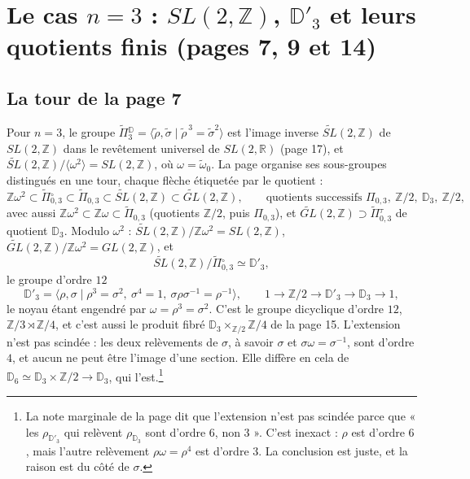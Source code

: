 \documentclass[11pt,a4paper]{article}
\begin{document}
\section*{Le cas $n = 3$ : $SL(2, \mathbb{Z})$, $\mathbb{D}'_3$ et leurs quotients finis (pages 7, 9 et 14)}

\subsection*{La tour de la page 7}

Pour $n = 3$, le groupe $\widetilde{\Pi}{}^{\mathbb{D}}_3 = \langle \tilde\rho,
\tilde\sigma \mid \tilde\rho^{\,3} = \tilde\sigma^2 \rangle$ est l'image inverse
$\widetilde{SL}(2, \mathbb{Z})$ de $SL(2, \mathbb{Z})$ dans le revêtement universel
de $SL(2, \mathbb{R})$ (page 17), et $\widetilde{SL}(2, \mathbb{Z}) /
\langle \omega^2 \rangle = SL(2, \mathbb{Z})$, où $\omega = \tilde\omega_0$. La page
organise ses sous-groupes distingués en une tour, chaque flèche étiquetée par le
quotient :
\[
\mathbb{Z}\omega^2 \subset \widetilde{\Pi}{}^{\circ}_{0,3} \subset
\widetilde{\Pi}_{0,3} \subset \widetilde{SL}(2, \mathbb{Z}) \subset
\widetilde{GL}(2, \mathbb{Z}),
\qquad
\text{quotients successifs } \Pi_{0,3},\ \mathbb{Z}/2,\ \mathbb{D}_3,\ \mathbb{Z}/2 ,
\]
avec aussi $\mathbb{Z}\omega^2 \subset \mathbb{Z}\omega \subset
\widetilde{\Pi}_{0,3}$ (quotients $\mathbb{Z}/2$, puis $\Pi_{0,3}$), et
$\widetilde{GL}(2, \mathbb{Z}) \supset \widetilde{\Pi}{}^{\tau}_{0,3}$ de quotient
$\mathbb{D}_3$. Modulo $\omega^2$ : $\widetilde{SL}(2, \mathbb{Z})/\mathbb{Z}\omega^2 =
SL(2, \mathbb{Z})$, $\widetilde{GL}(2, \mathbb{Z})/\mathbb{Z}\omega^2 =
GL(2, \mathbb{Z})$, et
\[
\widetilde{SL}(2, \mathbb{Z}) / \widetilde{\Pi}{}^{\circ}_{0,3} \simeq \mathbb{D}'_3 ,
\]
le groupe d'ordre $12$
\[
\mathbb{D}'_3 = \langle \rho, \sigma \mid \rho^3 = \sigma^2,\ \sigma^4 = 1,\
\sigma\rho\sigma^{-1} = \rho^{-1} \rangle ,
\qquad 1 \to \mathbb{Z}/2 \to \mathbb{D}'_3 \to \mathbb{D}_3 \to 1 ,
\]
le noyau étant engendré par $\omega = \rho^3 = \sigma^2$. C'est le groupe
dicyclique d'ordre $12$, $\mathbb{Z}/3 \rtimes \mathbb{Z}/4$, et c'est aussi le
produit fibré $\mathbb{D}_3 \times_{\mathbb{Z}/2} \mathbb{Z}/4$ de la page 15.
L'extension n'est pas scindée : les deux relèvements de $\sigma$, à savoir $\sigma$
et $\sigma\omega = \sigma^{-1}$, sont d'ordre $4$, et aucun ne peut être l'image
d'une section. Elle diffère en cela de $\mathbb{D}_6 \simeq \mathbb{D}_3 \times
\mathbb{Z}/2 \to \mathbb{D}_3$, qui l'est.\footnote{La note marginale de la page
dit que l'extension n'est pas scindée parce que « les $\rho_{\mathbb{D}'_3}$ qui
relèvent $\rho_{\mathbb{D}_3}$ sont d'ordre 6, non 3 ». C'est inexact : $\rho$
est d'ordre $6$, mais l'autre relèvement $\rho\omega = \rho^4$ est d'ordre $3$.
La conclusion est juste, et la raison est du côté de $\sigma$.}
\end{document}
